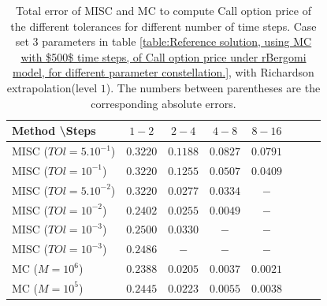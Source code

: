 \documentclass[11pt]{article}
\begin{document}
\begin{table}[h!]
	\centering
	\begin{tabular}{l*{6}{c}r}
		Method \textbackslash  Steps            & $1-2$ & $2-4$ & $4-8$ & $8-16$  \\
		\hline
		MISC ($TOl=5.10^{-1}$)  & $\mathbf{0.3220}$ & $\mathbf{0.1188}$ & $\mathbf{0.0827}$ & $\mathbf{0.0791}$ \\
		MISC ($TOl=10^{-1}$)  & $\mathbf{0.3220}$  & $\mathbf{0.1255}$ & $\mathbf{0.0507}$ & $\mathbf{0.0409}$  \\
		MISC ($TOl=5.10^{-2}$)  & $\mathbf{0.3220}$  & $\mathbf{0.0277}$ & $\mathbf{0.0334}$ & $\mathbf{-}$  \\
		
		MISC ($TOl=10^{-2}$)  & $\mathbf{0.2402}$ & $\mathbf{0.0255}$ & $\mathbf{0.0049}$ & $\mathbf{-}$  \\	
		
		MISC ($TOl=10^{-3}$)  &$\mathbf{0.2500}$  & $\mathbf{0.0330}$  & $\mathbf{-}$  & $\mathbf{-}$ \\	
		
		MISC ($TOl=10^{-3}$)  &$\mathbf{0.2486}$  & $\mathbf{-}$  & $\mathbf{-}$  & $\mathbf{-}$ \\	
		
		\hline
		MC ($M=10^6$) &$\mathbf{0.2388}$  & $\mathbf{0.0205}$  & $\mathbf{0.0037}$  & $\mathbf{0.0021}$ \\	
		
		
		MC ($M=10^5$) &$\mathbf{0.2445}$  & $\mathbf{0.0223}$  & $\mathbf{0.0055}$  & $\mathbf{0.0038}$ \\	
		\hline
	\end{tabular}
	\caption{Total  error of MISC and MC to compute Call option price of the different tolerances for different number of time steps. Case set $3$ parameters in table \ref{table:Reference solution, using MC with $500$ time steps, of Call option price under rBergomi model, for different parameter constellation.}, with Richardson extrapolation(level $1$). The numbers between parentheses are the corresponding absolute errors.}
	\label{Total  error of MISC and MC to compute Call option price of the different tolerances for different number of time steps. Case set $3$ parameters, with Richardson extrapolation(level $1$). The numbers between parentheses are the corresponding absolute errors.}
\end{table}
\end{document}
